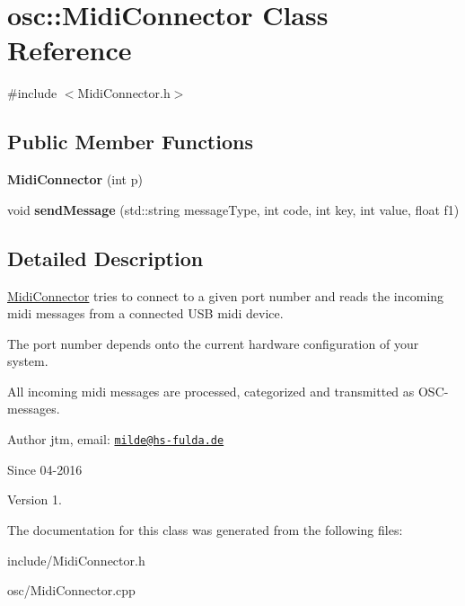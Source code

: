 \hypertarget{classosc_1_1MidiConnector}{}\section{osc\+:\+:Midi\+Connector Class Reference}
\label{classosc_1_1MidiConnector}


{\ttfamily \#include $<$Midi\+Connector.\+h$>$}

\subsection*{Public Member Functions}
\begin{DoxyCompactItemize}
\item 
{\bfseries Midi\+Connector} (int p)\hypertarget{classosc_1_1MidiConnector_a1629e8c842409a21dbc78258794556cc}{}\label{classosc_1_1MidiConnector_a1629e8c842409a21dbc78258794556cc}

\item 
void {\bfseries send\+Message} (std\+::string message\+Type, int code, int key, int value, float f1)\hypertarget{classosc_1_1MidiConnector_a700ee4383b29cd2bdc73f7cfc61a360e}{}\label{classosc_1_1MidiConnector_a700ee4383b29cd2bdc73f7cfc61a360e}

\end{DoxyCompactItemize}


\subsection{Detailed Description}
\hyperlink{classosc_1_1MidiConnector}{Midi\+Connector} tries to connect to a given port number and reads the incoming midi messages from a connected U\+SB midi device.

The port number depends onto the current hardware configuration of your system.

All incoming midi messages are processed, categorized and transmitted as O\+S\+C-\/messages.

\begin{DoxyAuthor}{Author}
jtm, email\+:  \href{mailto:milde@hs-fulda.de}{\tt milde@hs-\/fulda.\+de} 
\end{DoxyAuthor}
\begin{DoxySince}{Since}
04-\/2016 
\end{DoxySince}
\begin{DoxyVersion}{Version}
1. 
\end{DoxyVersion}


The documentation for this class was generated from the following files\+:\begin{DoxyCompactItemize}
\item 
include/Midi\+Connector.\+h\item 
osc/Midi\+Connector.\+cpp\end{DoxyCompactItemize}
